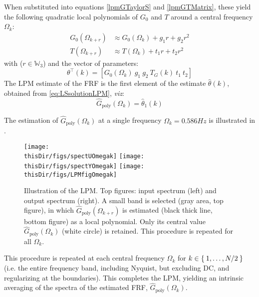 When substituted into equations \eqref{lpmGTaylorS} and \eqref{lpmGTMatrix},  these yield the following quadratic local polynomials of $G_0$ and $T$ around a central frequency $\Omega_{k}$:
\begin{align}
G_0(\Omega_{k+r})
  &\approx 
  G_0(\Omega_k)+g_1r+g_2r^2
  \label{eq:lpm:expansionG:quadratic}
\\
  T(\Omega_{k+r})
    &\approx 
    T(\Omega_k)+t_1r+t_2r^2
    \label{eq:lpm:expansionT:quadratic}
\end{align}
with ($r\in\mathbb{W}_3$) and the vector of parameters:
\begin{equation}\label{lpmThetaEst}
\theta^\top(k)=\left[G_0(\Omega_k) \ g_1 \ g_2\  T_G(k)\  t_1 \ t_2\right]
\end{equation}
The \gls{LPM} estimate of the \gls{FRF} is the first element of the estimate $\hat\theta(k)$, obtained from \eqref{eq:LSsolutionLPM}, \emph{viz}:
\begin{equation}
\hat{G}_\text{poly}(\Omega_k) = \hat\theta_1(k)
\end{equation}


The estimation of $\hat{G}_\text{poly}(\Omega_k)$ at a single frequency $\Omega_k = 0.586\unit{Hz}$ is illustrated in .%
\begin{figure}[htb] %
   \centering
   \texttt{[image: \\thisDir/figs/spectUOmegak]}
   \texttt{[image: \\thisDir/figs/spectYOmegak]}
   \texttt{[image: \\thisDir/figs/LPMfigOmegak]}
   \caption[Illustration of the LPM.]{Illustration of the \gls{LPM}. Top figures: input spectrum (left) and output spectrum (right). A small band is selected (gray area, top figure), in which $\hat G_\mathrm{poly}(\Omega_{k+r})$ is estimated (black thick line, bottom figure) as a local polynomial. Only its central value $\hat G_\mathrm{poly}(\Omega_k)$ (white circle) is retained. This procedure is repeated for all $\Omega_k$.}
   \label{LPM_Schematic_EG}
\end{figure}
This procedure is repeated at each central frequency $\Omega_k$ for  $k\in \Set{1,\dots,N/2}$ (i.e. the entire frequency band, including Nyquist, but excluding \gls{DC}, and regularizing at the boundaries). This completes the \gls{LPM}, yielding an intrinsic averaging of the spectra of the estimated \gls{FRF}, $\hat{G}_\text{poly}(\Omega_k)$.

